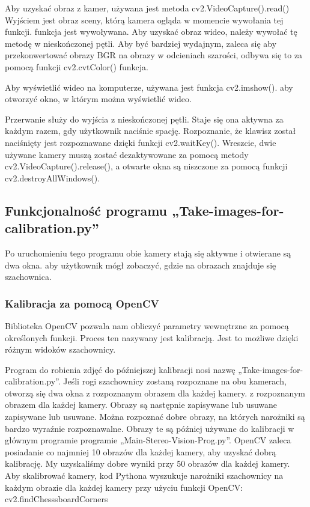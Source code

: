\documentclass[magisterska]{pracadypl}
\begin{document}
Aby uzyskać obraz z kamer, używana jest metoda cv2.VideoCapture().read()
Wyjściem jest obraz sceny, którą kamera ogląda w momencie wywołania tej funkcji.
funkcja jest wywoływana. Aby uzyskać obraz wideo, należy wywołać tę metodę
w nieskończonej pętli. Aby być bardziej wydajnym, zaleca się
aby przekonwertować obrazy BGR na obrazy w odcieniach szarości, odbywa się to za pomocą funkcji cv2.cvtColor()
funkcja.

Aby wyświetlić wideo na komputerze, używana jest funkcja cv2.imshow().
aby otworzyć okno, w którym można wyświetlić wideo.

Przerwanie służy do wyjścia z nieskończonej pętli. Staje się ona aktywna
za każdym razem, gdy użytkownik naciśnie spację. Rozpoznanie, że klawisz został naciśnięty
jest rozpoznawane dzięki funkcji cv2.waitKey().
Wreszcie, dwie używane kamery muszą zostać dezaktywowane za pomocą metody
cv2.VideoCapture().release(), a otwarte okna są niszczone za pomocą funkcji
cv2.destroyAllWindows().

\subsection{Funkcjonalność programu „Take-images-for-calibration.py”}

Po uruchomieniu tego programu obie kamery stają się aktywne i otwierane są dwa okna.
aby użytkownik mógł zobaczyć, gdzie na obrazach znajduje się szachownica.


\subsubsection{Kalibracja za pomocą OpenCV}

Biblioteka OpenCV pozwala nam obliczyć parametry wewnętrzne za pomocą określonych funkcji.
Proces ten nazywany jest kalibracją. Jest to możliwe dzięki różnym
widoków szachownicy.

Program do robienia zdjęć do późniejszej kalibracji nosi nazwę
„Take-images-for-calibration.py”.
Jeśli rogi szachownicy zostaną rozpoznane na obu kamerach, otworzą się dwa okna z rozpoznanym obrazem dla każdej kamery.
z rozpoznanym obrazem dla każdej kamery. Obrazy są następnie zapisywane lub usuwane
zapisywane lub usuwane. Można rozpoznać dobre obrazy, na których narożniki
są bardzo wyraźnie rozpoznawalne. Obrazy te są później używane do kalibracji w głównym programie
programie „Main-Stereo-Vision-Prog.py”. OpenCV zaleca posiadanie co najmniej 10
obrazów dla każdej kamery, aby uzyskać dobrą kalibrację. My uzyskaliśmy dobre wyniki przy 50
obrazów dla każdej kamery.
Aby skalibrować kamery, kod Pythona wyszukuje narożniki szachownicy na każdym
obrazie dla każdej kamery przy użyciu funkcji OpenCV: cv2.findChesssboardCorners
\end{document}
